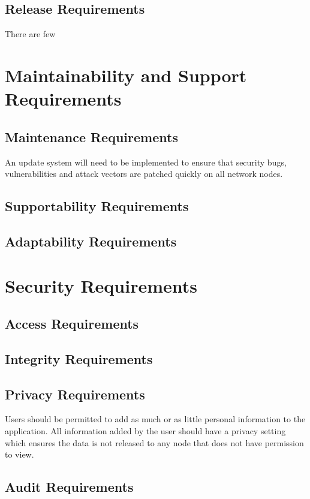 \documentclass{article}
\begin{document}
\subsection{Release Requirements}
There are few 

\section{Maintainability and Support Requirements}

\subsection{Maintenance Requirements}
An update system will need to be implemented to ensure that security bugs, vulnerabilities and attack vectors are patched quickly on all network nodes. 

\subsection{Supportability Requirements}


\subsection{Adaptability Requirements}


\section{Security Requirements}

\subsection{Access Requirements}


\subsection{Integrity Requirements}


\subsection{Privacy Requirements}
Users should be permitted to add as much or as little personal information to the application. All information added by the user should have a privacy setting which ensures the data is not released to any node that does not have permission to view.

\subsection{Audit Requirements}
\end{document}
